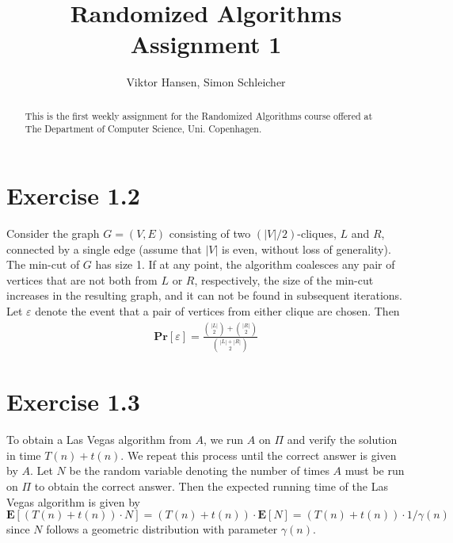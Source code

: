 \documentclass[12pt]{article}
\begin{document}
\nocite{*}


\title{Randomized Algorithms \\
       Assignment 1}

\author{Viktor Hansen, Simon Schleicher}

\maketitle

\begin{abstract}
  This is the first weekly assignment for the Randomized Algorithms course offered at The Department of Computer Science, Uni. Copenhagen.
\end{abstract}

\pagebreak

\section*{Exercise 1.2}
Consider the graph $G=(V,E)$ consisting of two $(\left|V\right|/2)$-cliques, $L$ and $R$, connected by a single edge (assume that $|V|$ is even, without loss of generality). The min-cut of $G$ has size 1. If at any point, the algorithm coalesces any pair of vertices that are not both from $L$ or $R$, respectively, the size of the min-cut increases in the resulting graph, and it can not be found in subsequent iterations. Let $\varepsilon$ denote the event that a pair of vertices from either clique are chosen. Then 
\begin{align*}
\mathbf{Pr}\left[ \varepsilon \right] = \frac{\binom{|L|}{2} + \binom{|R|}{2}}{\binom{|L|+|R|}{2}}
\end{align*}

\section*{Exercise 1.3}
To obtain a Las Vegas algorithm from $A$, we run $A$ on $\Pi$ and verify the solution in time $T(n) + t(n)$. We repeat this process until the correct answer is given by $A$. Let $N$ be the random variable denoting the number of times $A$ must be run on $\Pi$ to obtain the correct answer. Then the expected running time of the Las Vegas algorithm is given by $\mathbf{E}\left[ \left(T(n) + t(n)\right) \cdot N \right] = \left(T(n) + t(n)\right) \cdot \mathbf{E} \left[ N \right] = \left(T(n) + t(n)\right) \cdot 1/\gamma{(n)}$ since $N$ follows a geometric distribution with parameter $\gamma{(n)}$.
\end{document}
